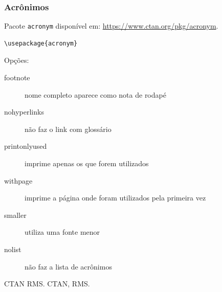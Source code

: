 \begin{frame}
\frametitle{Acrônimos}

Pacote \texttt{acronym} disponível em: \url{https://www.ctan.org/pkg/acronym}.

\begin{verbatim}
\usepackage{acronym}
\end{verbatim}



Opções:
\begin{description}
\item[footnote] nome completo aparece como nota de rodapé
\item[nohyperlinks] não faz o link com glossário 
\item[printonlyused] imprime apenas os que forem utilizados
\item[withpage] imprime a página onde foram utilizados pela primeira vez
\item[smaller] utiliza uma fonte menor
\item[nolist] não faz a lista de acrônimos
\end{description}


\begin{LTXexample}
\begin{acronym}
\end{acronym}

\lipsum[1][1-2] \ac{CTAN} \lipsum[1][3] \ac{RMS}.
\lipsum[1][4] \ac{CTAN}, \lipsum[1][5] \ac{RMS}.
\end{LTXexample}

\end{frame}
